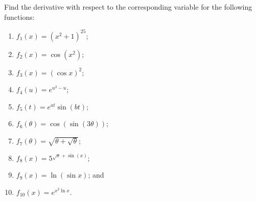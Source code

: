 \documentclass[11pt]{article}
\theoremstyle{break}
\numberwithin{equation}{theorem}
\begin{document}
\newpage
\begin{question}
    Find the derivative with respect to the corresponding variable for the following functions:
    \begin{enumerate}
        \item $f_1(x)=\left(x^2+1\right)^{25}$;
        \item $f_2(x)=\cos(x^2)$;
        \item $f_3(x)=\left(\cos x\right)^2$;
        \item $f_4(u)=e^{u^2-u}$;
        \item $f_5(t)=e^{at}\sin(bt)$;
        \item $f_6(\theta)=\cos(\sin(3\theta))$;
        \item $f_7(\theta)=\sqrt{\theta+\sqrt{\theta}}$;
        \item $f_8(x)=5^{\sqrt{x}+\sin(x)}$;
        \item $f_9(x)=\ln(\sin x)$; and
        \item $f_{10}(x)=e^{x^2\ln x}$.
    \end{enumerate}
\end{question}
\newpage
\ 
\newpage
\end{document}
